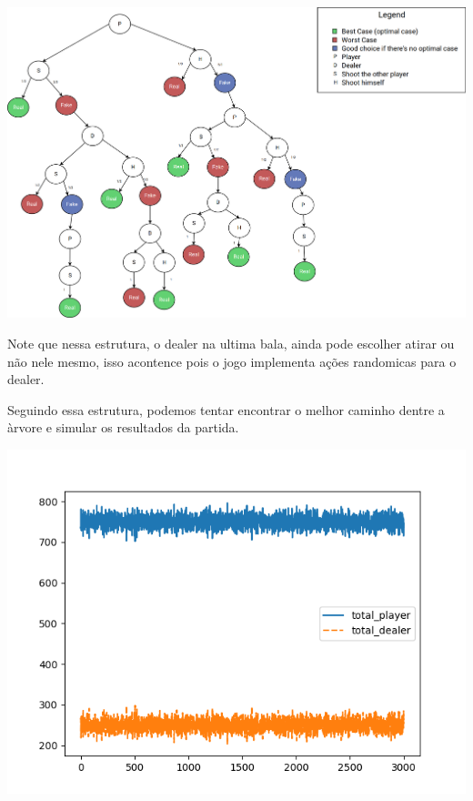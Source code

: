 \documentclass{article}
\begin{document}
\begin{center}
	\includegraphics[scale=0.2]{buckshot-roulette-diagram.png}
	\label{fig:classical-model-bckr}
\end{center}

Note que nessa estrutura, o dealer na ultima bala, ainda pode escolher atirar ou não nele mesmo, isso acontence pois o jogo implementa ações randomicas para o dealer.

Seguindo essa estrutura, podemos tentar encontrar o melhor caminho dentre a àrvore e simular os resultados da partida.


\begin{center}
	\includegraphics[scale=0.6]{optimal_player_strategy.png}
	\label{fig:classical-model-bckr-optimal-strategy}
\end{center}
\end{document}

